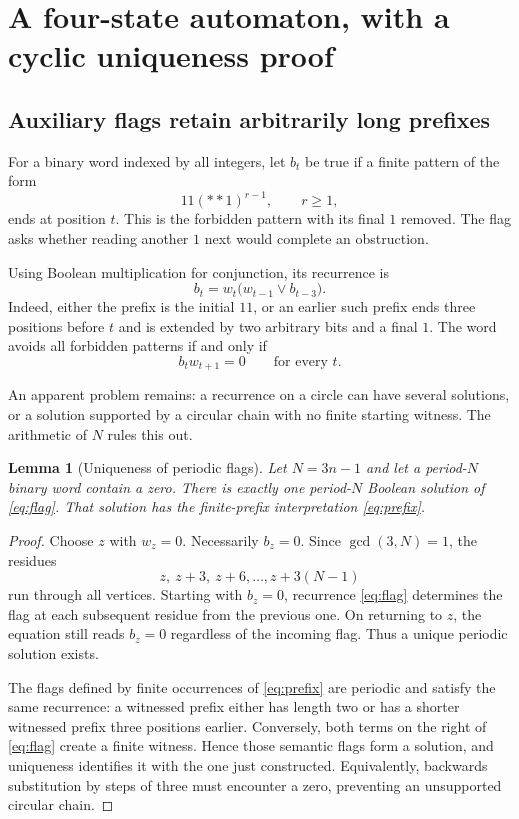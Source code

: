 \documentclass[11pt,a4paper]{article}
\newtheorem{lemma}[theorem]{Lemma}
\theoremstyle{definition}
\begin{document}
\section{A four-state automaton, with a cyclic uniqueness proof}
\label{sec:automaton}

\subsection{Auxiliary flags retain arbitrarily long prefixes}

For a binary word indexed by all integers, let $b_t$ be true if a finite
pattern of the form
\begin{equation}
 11(\ast\ast1)^{r-1},\qquad r\ge1,
 \label{eq:prefix}
\end{equation}
ends at position $t$. This is the forbidden pattern with its final $1$
removed. The flag asks whether reading another $1$ next would complete an
obstruction.

Using Boolean multiplication for conjunction, its recurrence is
\begin{equation}
 b_t=w_t\bigl(w_{t-1}\lor b_{t-3}\bigr).
 \label{eq:flag}
\end{equation}
Indeed, either the prefix is the initial $11$, or an earlier such prefix
ends three positions before $t$ and is extended by two arbitrary bits and
a final $1$. The word avoids all forbidden patterns if and only if
\begin{equation}
 b_t w_{t+1}=0\qquad\text{for every }t.
 \label{eq:reject}
\end{equation}

An apparent problem remains: a recurrence on a circle can have several
solutions, or a solution supported by a circular chain with no finite
starting witness. The arithmetic of $N$ rules this out.

\begin{lemma}[Uniqueness of periodic flags]
\label{lem:unique}
Let $N=3n-1$ and let a period-$N$ binary word contain a zero. There is exactly
one period-$N$ Boolean solution of \cref{eq:flag}. That solution has the
finite-prefix interpretation \cref{eq:prefix}.
\end{lemma}

\begin{proof}
Choose $z$ with $w_z=0$. Necessarily $b_z=0$. Since
$\gcd(3,N)=1$, the residues
\[
 z,\ z+3,\ z+6,\ldots,z+3(N-1)
\]
run through all vertices. Starting with $b_z=0$, recurrence
\cref{eq:flag} determines the flag at each subsequent residue from the
previous one. On returning to $z$, the equation still reads $b_z=0$
regardless of the incoming flag. Thus a unique periodic solution exists.

The flags defined by finite occurrences of \cref{eq:prefix} are periodic and
satisfy the same recurrence: a witnessed prefix either has length two or
has a shorter witnessed prefix three positions earlier. Conversely, both
terms on the right of \cref{eq:flag} create a finite witness. Hence those
semantic flags form a solution, and uniqueness identifies it with the one
just constructed. Equivalently, backwards substitution by steps of three
must encounter a zero, preventing an unsupported circular chain.
\end{proof}
\end{document}
